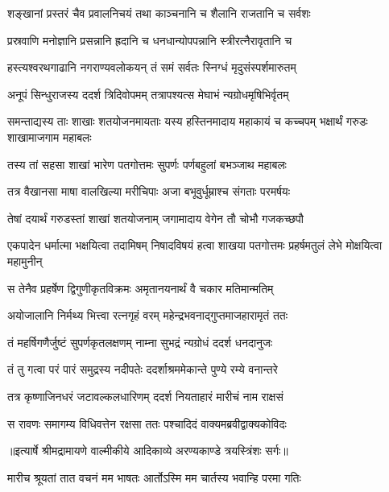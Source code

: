 \twolineshloka
{शङ्खानां प्रस्तरं चैव प्रवालनिचयं तथा}
{काञ्चनानि च शैलानि राजतानि च सर्वशः} %

\twolineshloka
{प्रस्रवाणि मनोज्ञानि प्रसन्नानि ह्रदानि च}
{धनधान्योपपन्नानि स्त्रीरत्नैरावृतानि च} %

\twolineshloka
{हस्त्यश्वरथगाढानि नगराण्यवलोकयन्}
{तं समं सर्वतः स्निग्धं मृदुसंस्पर्शमारुतम्} %

\twolineshloka
{अनूपं सिन्धुराजस्य ददर्श त्रिदिवोपमम्}
{तत्रापश्यत्स मेघाभं न्यग्रोधमृषिभिर्वृतम्} %

\threelineshloka
{समन्ताद्यस्य ताः शाखाः शतयोजनमायताः}
{यस्य हस्तिनमादाय महाकायं च कच्चपम्}
{भक्षार्थं गरुडः शाखामाजगाम महाबलः} %

\twolineshloka
{तस्य तां सहसा शाखां भारेण पतगोत्तमः}
{सुपर्णः पर्णबहुलां बभञ्जाथ महाबलः} %

\twolineshloka
{तत्र वैखानसा माषा वालखिल्या मरीचिपाः}
{अजा बभूवुर्धूम्राश्च संगताः परमर्षयः} %

\twolineshloka
{तेषां दयार्थं गरुडस्तां शाखां शतयोजनाम्}
{जगामादाय वेगेन तौ चोभौ गजकच्छपौ} %

\threelineshloka
{एकपादेन धर्मात्मा भक्षयित्वा तदामिषम्}
{निषादविषयं हत्वा शाखया पतगोत्तमः}
{प्रहर्षमतुलं लेभे मोक्षयित्वा महामुनीन्} %

\twolineshloka
{स तेनैव प्रहर्षेण द्विगुणीकृतविक्रमः}
{अमृतानयनार्थं वै चकार मतिमान्मतिम्} %

\twolineshloka
{अयोजालानि निर्मथ्य भित्त्वा रत्नगृहं वरम्}
{महेन्द्रभवनाद्गुप्तमाजहारामृतं ततः} %

\twolineshloka
{तं महर्षिगणैर्जुष्टं सुपर्णकृतलक्षणम्}
{नाम्ना सुभद्रं न्यग्रोधं ददर्श धनदानुजः} %

\twolineshloka
{तं तु गत्वा परं पारं समुद्रस्य नदीपतेः}
{ददर्शाश्रममेकान्ते पुण्ये रम्ये वनान्तरे} %

\twolineshloka
{तत्र कृष्णाजिनधरं जटावल्कलधारिणम्}
{ददर्श नियताहारं मारीचं नाम राक्षसं} %

\twolineshloka
{स रावणः समागम्य विधिवत्तेन रक्षसा}
{ततः पश्चादिदं वाक्यमब्रवीद्वाक्यकोविदः} %


{॥इत्यार्षे श्रीमद्रामायणे वाल्मीकीये आदिकाव्ये अरण्यकाण्डे त्रयस्त्रिंशः सर्गः॥}


\twolineshloka
{मारीच श्रूयतां तात वचनं मम भाषतः}
{आर्तोऽस्मि मम चार्तस्य भवान्हि परमा गतिः} %

